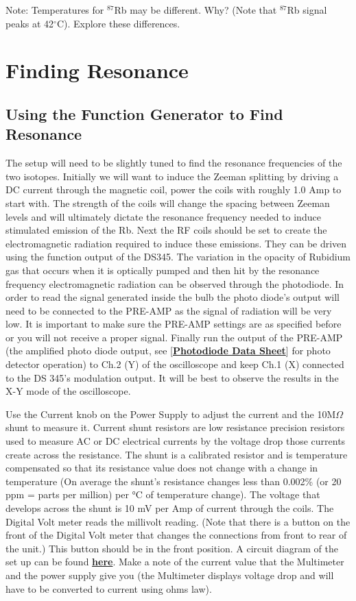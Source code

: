 \documentclass{../lab}
\newcommand{\PhotodiodeDataSheet}{http://physics111.lib.berkeley.edu/Physics111/Reprints/OPT/Photodiodes-10DP.pdf}
\newcommand{\CircuitForMagneticCoils}{http://experimentationlab.berkeley.edu/sites/default/files/OPT/Circuitformagnetic\%20coils.png}
\begin{document}
\noindent Note: Temperatures for $^{87}$Rb may be different. Why? (Note that $^{87}$Rb signal peaks at 42$^\circ$C). Explore these differences.

\section{Finding Resonance}

\subsection{Using the Function Generator to Find Resonance}

The setup will need to be slightly tuned to find the resonance frequencies of the two isotopes. Initially we will want to induce the Zeeman splitting by driving a DC current through the magnetic coil, power the coils with roughly 1.0 Amp to start with. The strength of the coils will change the spacing between Zeeman levels and will ultimately dictate the resonance frequency needed to induce stimulated emission of the Rb. Next the RF coils should be set to create the electromagnetic radiation required to induce these emissions. They can be driven using the function output of the DS345. The variation in the opacity of Rubidium gas that occurs when it is optically pumped and then hit by the resonance frequency electromagnetic radiation can be observed through the photodiode. In order to read the signal generated inside the bulb the photo diode's output will need to be connected to the PRE-AMP as the signal of radiation will be very low. It is important to make sure the PRE-AMP settings are as specified before or you will not receive a proper signal. Finally run the output of the PRE-AMP (the amplified photo diode output, see [\href{\PhotodiodeDataSheet}{\textbf{Photodiode Data Sheet}}] for photo detector operation) to Ch.2 (Y) of the oscilloscope and keep Ch.1 (X) connected to the DS 345's modulation output. It will be best to observe the results in the X-Y mode of the oscilloscope. \\

\newpage

Use the Current knob on the Power Supply to adjust the current and the 10M$\Omega$ shunt to measure it. Current shunt resistors are low resistance precision resistors used to measure AC or DC electrical currents by the voltage drop those currents create across the resistance. The shunt is a calibrated resistor and is temperature compensated so that its resistance value does not change with a change in temperature (On average the shunt's resistance changes less than 0.002\% (or 20 ppm = parts per million) per °C of temperature change). The voltage that develops across the shunt is 10 mV per Amp of current through the coils. The Digital Volt meter reads the millivolt reading. (Note that there is a button on the front of the Digital Volt meter that changes the connections from front to rear of the unit.) This button should be in the front position. A circuit diagram of the set up can be found \href{\CircuitForMagneticCoils}{\textbf{here}}. Make a note of the current value that the Multimeter and the power supply give you (the Multimeter displays voltage drop and will have to be converted to current using ohms law).
\end{document}
